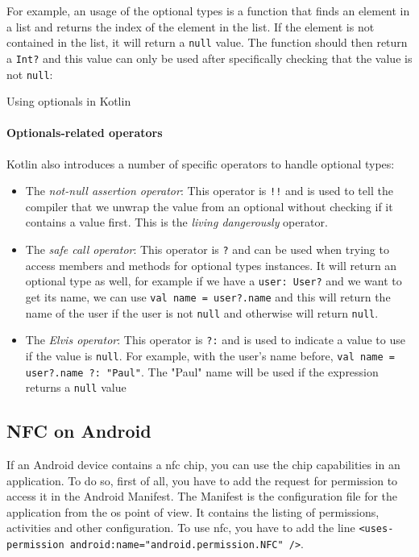 \documentclass[twoside, openright,11pt,a4paper]{book}
\newenvironment{code}{\captionsetup{type=listing}}{}
\begin{document}
For example, an usage of the optional types is a function that finds an element in a list and returns the index of the element in the list. If the element is not contained in the list, it will return a \texttt{null} value. The function should then return a \texttt{Int?} and this value can only be used after specifically checking that the value is not \texttt{null}:
\begin{code}
\caption{Using optionals in Kotlin}	
\end{code}


\paragraph{Optionals-related operators}
\label{optional_operators_kt}
Kotlin also introduces a number of specific operators to handle optional types:
\begin{itemize}
	\item The \emph{not-null assertion operator}: This operator is \verb+!!+ and is used to tell the compiler that we unwrap the value from an optional without checking if it contains a value first. This is the \emph{living dangerously} operator.
	\item The \emph{safe call operator}: This operator is \verb+?+ and can be used when trying to access members and methods for optional types instances. It will return an optional type as well, for example if we have a \texttt{user: User?} and we want to get its name, we can use \texttt{val name = user?.name} and this will return the name of the user if the user is not \texttt{null} and otherwise will return \texttt{null}.
	\item The \emph{Elvis operator}: This operator is \verb+?:+ and is used to indicate a value to use if the value is \texttt{null}. For example, with the user's name before, \texttt{val name = user?.name ?: "Paul"}. The "Paul" name will be used if the expression returns a \texttt{null} value
\end{itemize}

\subsection{NFC on Android}
If an Android device contains a \gls{nfc} chip, you can use the chip capabilities in an application. To do so, first of all, you have to add the request for permission to access it in the Android Manifest. The Manifest is the configuration file for the application from the \gls{os} point of view. It contains the listing of permissions, activities and other configuration. To use \gls{nfc}, you have to add the line \texttt{<uses-permission android:name="android.permission.NFC" />}. \\
\end{document}
